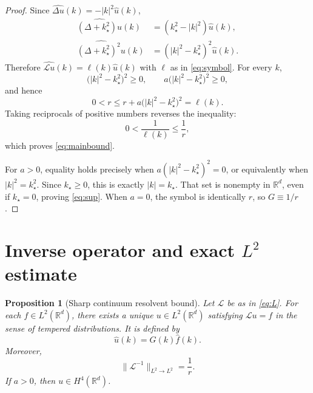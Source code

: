 \documentclass[11pt]{article}
\newtheorem{proposition}{Proposition}
\newcommand{\R}{\mathbb R}
\newcommand{\norm}[1]{\lVert #1\rVert}
\begin{document}
\begin{proof}
Since $\widehat{\Delta u}(k)=-|k|^2\widehat u(k)$,
\begin{align*}
  \widehat{(\Delta+k_\star^2)u}(k)
    &=(k_\star^2-|k|^2)\widehat u(k),\\
  \widehat{(\Delta+k_\star^2)^2u}(k)
    &=(|k|^2-k_\star^2)^2\widehat u(k).
\end{align*}
Therefore $\widehat{\mathcal Lu}(k)=\ell(k)\widehat u(k)$ with
$\ell$ as in \eqref{eq:symbol}. For every $k$,
\begin{equation}\label{eq:denom}
  \bigl(|k|^2-k_\star^2\bigr)^2\geq0,
  \qquad
  a\bigl(|k|^2-k_\star^2\bigr)^2\geq0,
\end{equation}
and hence
\begin{equation}
  0<r\leq r+a\bigl(|k|^2-k_\star^2\bigr)^2=\ell(k).
\end{equation}
Taking reciprocals of positive numbers reverses the inequality:
\begin{equation}
  0<\frac{1}{\ell(k)}\leq\frac1r,
\end{equation}
which proves \eqref{eq:mainbound}.

For $a>0$, equality holds precisely when
$a(|k|^2-k_\star^2)^2=0$, or equivalently when
$|k|^2=k_\star^2$. Since $k_\star\geq0$, this is exactly
$|k|=k_\star$. That set is nonempty in $\R^d$, even if
$k_\star=0$, proving \eqref{eq:sup}. When $a=0$, the symbol is
identically $r$, so $G\equiv1/r$.
\end{proof}

\section{Inverse operator and exact $L^2$ estimate}

\begin{proposition}[Sharp continuum resolvent bound]\label{prop:L2}
Let $\mathcal L$ be as in \eqref{eq:L}. For each $f\in L^2(\R^d)$,
there exists a unique $u\in L^2(\R^d)$ satisfying
$\mathcal Lu=f$ in the sense of tempered distributions. It is defined
by
\begin{equation}\label{eq:solution}
  \widehat u(k)=G(k)\widehat f(k).
\end{equation}
Moreover,
\begin{equation}\label{eq:operatornorm}
  \boxed{\quad
  \norm{\mathcal L^{-1}}_{L^2\to L^2}=\frac1r.
  \quad}
\end{equation}
If $a>0$, then $u\in H^4(\R^d)$.
\end{proposition}
\end{document}
